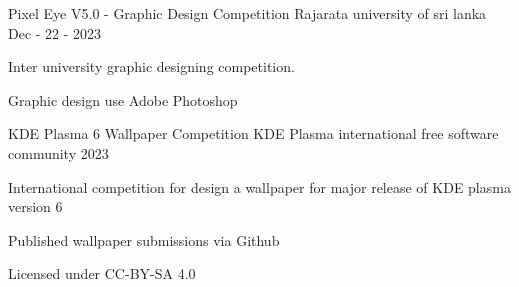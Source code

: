 

\begin{cventries}

  \cventry
    {Pixel Eye V5.0 - Graphic Design Competition} %
    {Rajarata university of sri lanka} %
    {Dec - 22 - 2023} %
    {
      \begin{cvitems} %
        \item {Inter university graphic designing competition.}
        \item {Graphic design use Adobe Photoshop}
      \end{cvitems}
    }

  \cventry
    {KDE Plasma 6 Wallpaper Competition} %
    {KDE Plasma international free software community} %
    {2023} %
    {
      \begin{cvitems} %
        \item {International competition for design a wallpaper for major release of KDE plasma version 6}
        \item {Published wallpaper submissions via Github}
        \item {Licensed under CC-BY-SA 4.0}
      \end{cvitems}
    }

\end{cventries}
